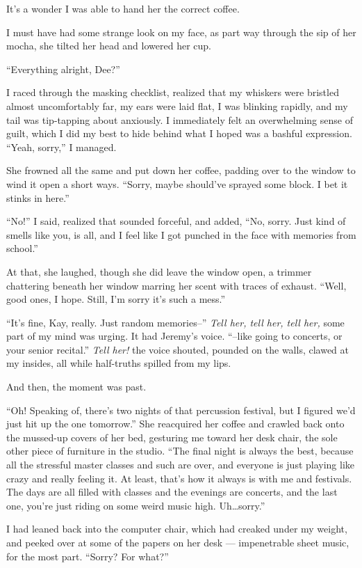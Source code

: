 It's a wonder I was able to hand her the correct coffee.

I must have had some strange look on my face, as part way through the sip of her mocha, she tilted her head and lowered her cup.

``Everything alright, Dee?''

I raced through the masking checklist, realized that my whiskers were bristled almost uncomfortably far, my ears were laid flat, I was blinking rapidly, and my tail was tip-tapping about anxiously. I immediately felt an overwhelming sense of guilt, which I did my best to hide behind what I hoped was a bashful expression. ``Yeah, sorry,'' I managed.

She frowned all the same and put down her coffee, padding over to the window to wind it open a short ways. ``Sorry, maybe should've sprayed some block. I bet it stinks in here.''

``No!'' I said, realized that sounded forceful, and added, ``No, sorry. Just kind of smells like you, is all, and I feel like I got punched in the face with memories from school.''

At that, she laughed, though she did leave the window open, a trimmer chattering beneath her window marring her scent with traces of exhaust. ``Well, good ones, I hope. Still, I'm sorry it's such a mess.''

``It's fine, Kay, really. Just random memories--'' \emph{Tell her, tell her, tell her,} some part of my mind was urging. It had Jeremy's voice. ``--like going to concerts, or your senior recital.'' \emph{Tell her!} the voice shouted, pounded on the walls, clawed at my insides, all while half-truths spilled from my lips.

And then, the moment was past.

``Oh! Speaking of, there's two nights of that percussion festival, but I figured we'd just hit up the one tomorrow.'' She reacquired her coffee and crawled back onto the mussed-up covers of her bed, gesturing me toward her desk chair, the sole other piece of furniture in the studio. ``The final night is always the best, because all the stressful master classes and such are over, and everyone is just playing like crazy and really feeling it. At least, that's how it always is with me and festivals. The days are all filled with classes and the evenings are concerts, and the last one, you're just riding on some weird music high. Uh\ldots sorry.''

I had leaned back into the computer chair, which had creaked under my weight, and peeked over at some of the papers on her desk --- impenetrable sheet music, for the most part. ``Sorry? For what?''

